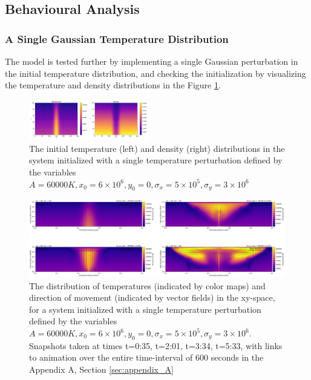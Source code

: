 \documentclass[10pt, nofootinbib, twocolumn]{revtex4-1}
\begin{document}
\subsection{Behavioural Analysis}
\subsubsection{A Single Gaussian Temperature Distribution}
The model is tested further by implementing a single Gaussian perturbation in the initial temperature distribution, and checking the initialization by visualizing the temperature and density distributions in the Figure \ref{fig:single_both}.
\begin{figure}[H]
    \centering
    \includegraphics[width =0.47\textwidth]{figures/initial_two_single.pdf} 
    \caption{The initial temperature (left) and density (right) distributions in the system initialized with a single temperature perturbation defined by the variables $A=60000 K, x_0=6\times 10^6, y_0=0, \sigma_x=5\times 10^5, \sigma_y=3\times 10^6$}
    \label{fig:single_both}
\end{figure}
\begin{figure}
    \centering
    \includegraphics[width=1\textwidth]{figures/single_collage.png} 
    \caption{The distribution of temperatures (indicated by color maps) and direction of movement (indicated by vector fields) in the xy-space, for a system initialized with a single temperature perturbation defined by the variables $A=60000 K, x_0=6\times 10^6, y_0=0, \sigma_x=5\times 10^5, \sigma_y=3\times 10^6$. Snapshots taken at times t=0:35, t=2:01, t=3:34, t=5:33, with links to animation over the entire time-interval of 600 seconds in the Appendix A, Section \ref{sec:appendix_A}}
    \label{fig:single_shots}
\end{figure}
\end{document}
